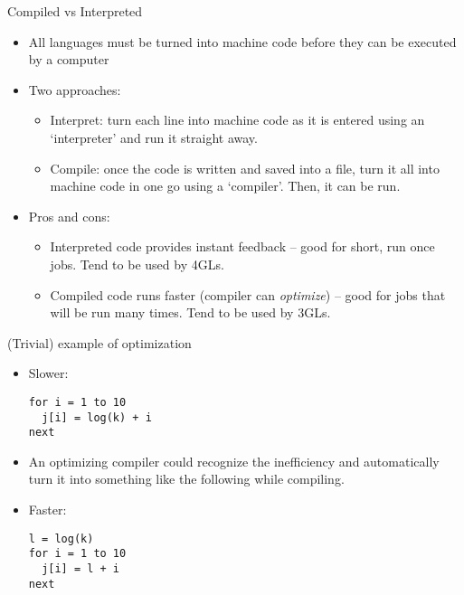 \documentclass[ignorenonframetext,]{beamer}
\providecommand{\tightlist}{%
  \setlength{\itemsep}{0pt}\setlength{\parskip}{0pt}}
\begin{document}
\begin{frame}{Compiled vs Interpreted}

\begin{itemize}[<+->]
\tightlist
\item
  All languages must be turned into machine code before they can be
  executed by a computer
\item
  Two approaches:

  \begin{itemize}[<+->]
  \tightlist
  \item
    Interpret: turn each line into machine code as it is entered using
    an `interpreter' and run it straight away.
  \item
    Compile: once the code is written and saved into a file, turn it all
    into machine code in one go using a `compiler'. Then, it can be run.
  \end{itemize}
\item
  Pros and cons:

  \begin{itemize}[<+->]
  \tightlist
  \item
    Interpreted code provides instant feedback -- good for short, run
    once jobs. Tend to be used by 4GLs.
  \item
    Compiled code runs faster (compiler can \emph{optimize}) -- good for
    jobs that will be run many times. Tend to be used by 3GLs.
  \end{itemize}
\end{itemize}

\end{frame}

\begin{frame}[fragile]{(Trivial) example of optimization}

\begin{itemize}[<+->]
\item
  Slower:

\begin{verbatim}
for i = 1 to 10
  j[i] = log(k) + i
next
\end{verbatim}
\item
  An optimizing compiler could recognize the inefficiency and
  automatically turn it into something like the following while
  compiling.
\item
  Faster:

\begin{verbatim}
l = log(k)
for i = 1 to 10
  j[i] = l + i
next
\end{verbatim}
\end{itemize}

\end{frame}
\end{document}
